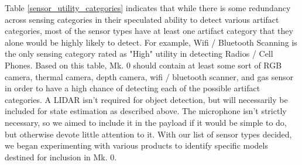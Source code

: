 Table \ref{sensor_utility_categories} indicates that while there is some redundancy across sensing categories in their speculated ability to detect various artifact categories, most of the sensor types have at least one artifact category that they alone would be highly likely to detect. For example, Wifi / Bluetooth Scanning is the only sensing category rated as "High" utility in detecting Radios / Cell Phones. Based on this table, Mk. 0 should contain at least some sort of RGB camera, thermal camera, depth camera, wifi / bluetooth scanner, and gas sensor in order to have a high chance of detecting each of the possible artifact categories. A LIDAR isn't required for object detection, but will necessarily be included for state estimation as described above. The microphone isn't strictly necessary, so we aimed to include it in the payload if it would be simple to do, but otherwise devote little attention to it. With our list of sensor types decided, we began experimenting with various products to identify specific models destined for inclusion in Mk. 0.

